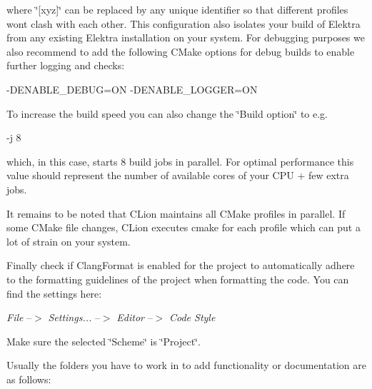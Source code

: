 where \char`\"{}\mbox{[}xyz\mbox{]}\char`\"{} can be replaced by any unique identifier so that different profiles won\textquotesingle{}t clash with each other. This configuration also isolates your build of Elektra from any existing Elektra installation on your system. For debugging purposes we also recommend to add the following C\+Make options for debug builds to enable further logging and checks\+:


\begin{DoxyCode}
-DENABLE\_DEBUG=ON
-DENABLE\_LOGGER=ON
\end{DoxyCode}


To increase the build speed you can also change the \char`\"{}\+Build option\char`\"{} to e.\+g.


\begin{DoxyCode}
-j 8
\end{DoxyCode}


which, in this case, starts 8 build jobs in parallel. For optimal performance this value should represent the number of available cores of your C\+PU + few extra jobs.

It remains to be noted that C\+Lion maintains all C\+Make profiles in parallel. If some C\+Make file changes, C\+Lion executes {\ttfamily cmake} for each profile which can put a lot of strain on your system.

Finally check if {\ttfamily Clang\+Format} is enabled for the project to automatically adhere to the formatting guidelines of the project when formatting the code. You can find the settings here\+:

{\itshape File} --$>$ {\itshape Settings...} --$>$ {\itshape Editor} --$>$ {\itshape Code Style}

Make sure the selected \char`\"{}\+Scheme\char`\"{} is \char`\"{}\+Project\char`\"{}.

Usually the folders you have to work in to add functionality or documentation are as follows\+:


